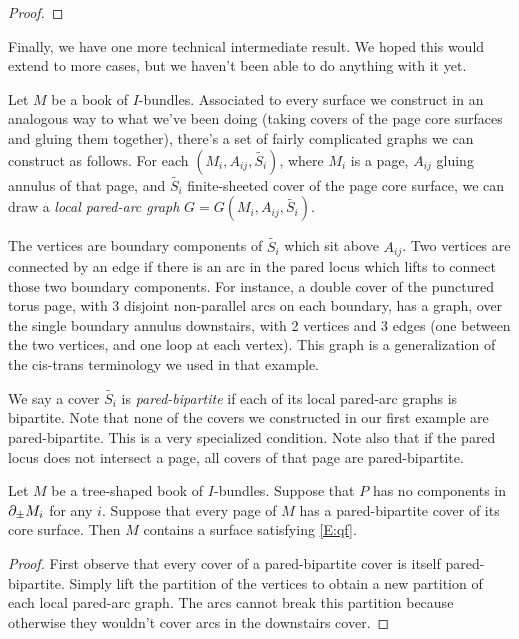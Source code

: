{\begin{proof}
\end{proof}

Finally, we have one more technical intermediate result. We hoped this would
extend to more cases, but we haven't been able to do anything with it yet.

Let $M$ be a book of $I$-bundles. Associated to every surface we construct in
an analogous way to what we've been doing (taking covers of the page core
surfaces and gluing them together), there's a set of fairly complicated graphs
we can construct as follows. For each $(M_i,A_{ij},\widetilde{S_i})$, where
$M_i$ is a page, $A_{ij}$ gluing annulus of that page, and $\widetilde{S_i}$
finite-sheeted cover of the page core surface, we can draw a \emph{local
pared-arc graph} $G=G(M_i,A_{ij},\widetilde{S_i})$.

The vertices are boundary components of $\widetilde{S_i}$ which sit above
$A_{ij}$. Two vertices are connected by an edge if there is an arc in the pared
locus which lifts to connect those two boundary components. For instance,
a double cover of the punctured torus page, with 3 disjoint non-parallel arcs
on each boundary, has a graph, over the single boundary annulus downstairs,
with 2 vertices and 3 edges (one between the two vertices, and one loop at each
vertex). This graph is a generalization of the cis-trans terminology we used in
that example.

We say a cover $\widetilde{S_i}$ is \emph{pared-bipartite} if each of its local
pared-arc graphs is bipartite. Note that none of the covers we constructed in
our first example are pared-bipartite. This is a very specialized condition.
Note also that if the pared locus does not intersect a page, all covers of that
page are pared-bipartite.

\begin{thm}

Let $M$ be a tree-shaped book of $I$-bundles. Suppose that $P$ has no
components in $\partial_\pm M_i$ for any $i$. Suppose that every page of $M$
has a pared-bipartite cover of its core surface. Then $M$ contains a surface
satisfying \eqref{E:qf}.

\end{thm}
\begin{proof}

First observe that every cover of a pared-bipartite cover is itself
pared-bipartite. Simply lift the partition of the vertices to obtain a new
partition of each local pared-arc graph. The arcs cannot break this
partition because otherwise they wouldn't cover arcs in the downstairs cover.


\end{proof}}
